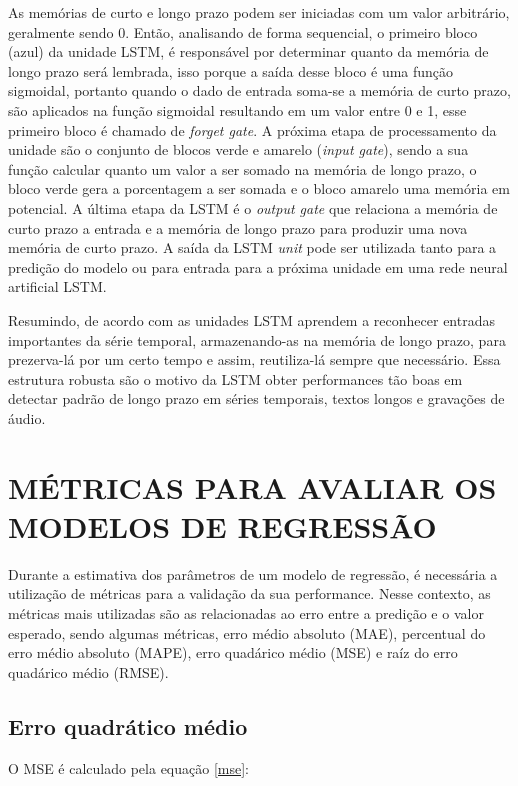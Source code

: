 \documentclass[
  12pt,		%
  a4paper,	%
  openright,%
  oneside,	%
  chapter=TITLE,		%
  section=TITLE,		%
  english,	%
  french,	%
  spanish,	%
  brazil	%
]{abntex2}
\begin{document}
    As memórias de curto e longo prazo podem ser iniciadas com um valor arbitrário, geralmente sendo 0. Então, analisando
    de forma sequencial, o primeiro bloco (azul) da unidade LSTM, é responsável por determinar quanto da memória de longo prazo será lembrada,
    isso porque a saída desse bloco é uma função sigmoidal, portanto quando o dado de entrada soma-se a memória de curto prazo, são aplicados
    na função sigmoidal resultando em um valor entre 0 e 1, esse primeiro bloco é chamado de \textit{forget gate}.
    A próxima etapa de processamento da unidade são o conjunto de blocos verde e amarelo (\textit{input gate}), sendo a sua função calcular 
    quanto um valor a ser somado na memória de longo prazo, o bloco verde gera a porcentagem a ser somada e o bloco amarelo
    uma memória em potencial.
    A última etapa da LSTM é o \textit{output gate} que relaciona a memória de curto prazo a entrada e a memória de longo prazo
    para produzir uma nova memória de curto prazo. A saída da LSTM \textit{unit} pode ser utilizada tanto para a predição do modelo ou para entrada para a próxima unidade
    em uma rede neural artificial LSTM.

    Resumindo, de acordo com \cite[]{hands_on_ml} as unidades LSTM aprendem a reconhecer entradas importantes da série temporal, 
    armazenando-as na memória de longo prazo, para prezerva-lá por um certo tempo e assim, reutiliza-lá sempre que necessário. 
    Essa estrutura robusta são o motivo da LSTM obter performances tão boas em detectar padrão de longo prazo 
    em séries temporais, textos longos e gravações de áudio.


    \section{MÉTRICAS PARA AVALIAR OS MODELOS DE REGRESSÃO}
    Durante a estimativa dos parâmetros de um modelo de regressão, é necessária a utilização de métricas
    para a validação da sua performance. Nesse contexto, as métricas mais utilizadas são as relacionadas
    ao erro entre a predição e o valor esperado, sendo algumas métricas, erro médio absoluto (MAE), percentual do erro médio absoluto (MAPE), 
    erro quadárico médio (MSE) e raíz do erro quadárico médio (RMSE).

    \subsection{Erro quadrático médio}
    O MSE é calculado pela equação \ref*{mse}: 
\end{document}
